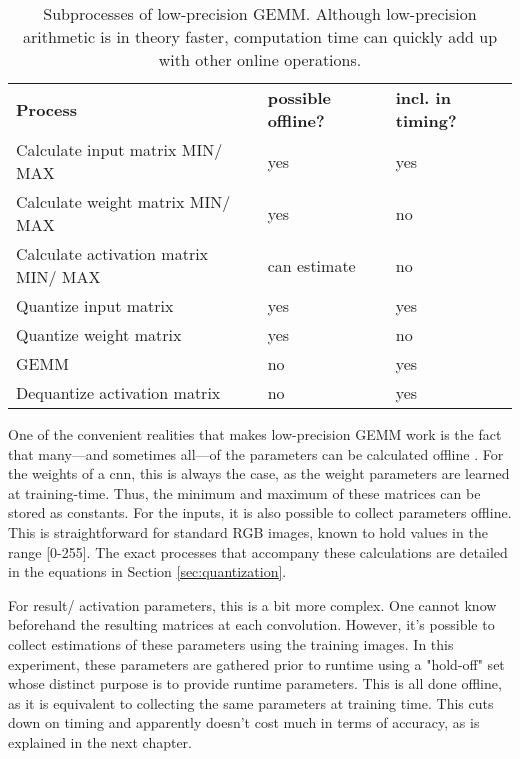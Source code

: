 \begin{table}[]
\centering
\caption[Low-precision GEMM broken down by process]{Subprocesses of low-precision GEMM. Although low-precision arithmetic is in theory faster, computation time can quickly add up with other online operations.}
\label{tbl:gemmlowp}
\begin{tabular}{lll}
\textbf{Process}                                       & \textbf{possible offline?} & \textbf{incl. in timing?} \\
Calculate input matrix MIN/ MAX     & yes                        & yes                       \\
Calculate weight matrix MIN/ MAX     & yes                        & no                        \\
Calculate activation matrix MIN/ MAX & can estimate               & no                        \\
Quantize input matrix                & yes                        & yes                       \\
Quantize weight matrix               & yes                        & no                        \\
GEMM                                 & no                         & yes                       \\
Dequantize activation matrix         & no                         & yes                      
\end{tabular}
\end{table}

One of the convenient realities that makes low-precision GEMM work is the fact that many---and sometimes all---of the parameters can be calculated offline \cite{warden_quantize}. For the weights of a cnn, this is always the case, as the weight parameters are learned at training-time. Thus, the minimum and maximum of these matrices can be stored as constants. For the inputs, it is also possible to collect parameters offline. This is straightforward for standard RGB images, known to hold values in the range [0-255]. The exact processes that accompany these calculations are detailed in the equations in Section \ref{sec:quantization}.

For result/ activation parameters, this is a bit more complex. One cannot know beforehand the resulting matrices at each convolution. However, it's possible to collect estimations of these parameters using the training images. In this experiment, these parameters are gathered prior to runtime using a "hold-off" set whose distinct purpose is to provide runtime parameters. This is all done offline, as it is equivalent to collecting the same parameters at training time. This cuts down on timing and apparently doesn't cost much in terms of accuracy, as is explained in the next chapter.

